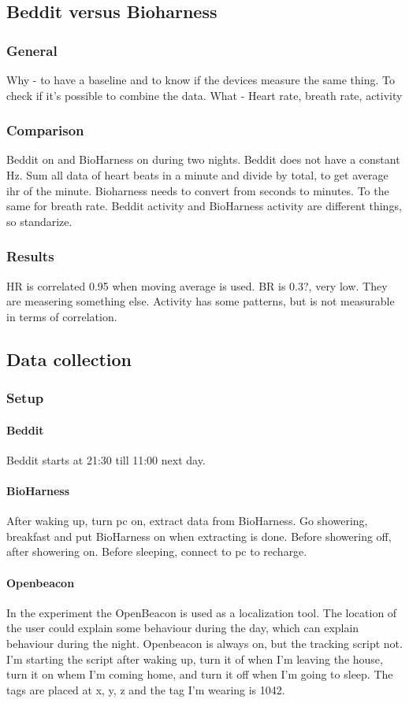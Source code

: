 	\subsection{Beddit versus Bioharness}
		\subsubsection{General}
			Why - to have a baseline and to know if the devices measure the same thing. To check if it's possible to combine the data.
			What - Heart rate, breath rate, activity
		\subsubsection{Comparison}
			Beddit on and BioHarness on during two nights.
			Beddit does not have a constant Hz. Sum all data of heart beats in a minute and divide by total, to get average ihr of the minute. 
			Bioharness needs to convert from seconds to minutes. To the same for breath rate. 
			Beddit activity and BioHarness activity are different things, so standarize.

		\subsubsection{Results}
			HR is correlated 0.95 when moving average is used.
			BR is 0.3?, very low. They are measering something else.
			Activity has some patterns, but is not measurable in terms of correlation.
	\subsection{Data collection}
		\subsubsection{Setup}
			\paragraph{Beddit}
				Beddit starts at 21:30 till 11:00 next day. 
			\paragraph{BioHarness}
				After waking up, turn pc on, extract data from BioHarness. Go showering, breakfast and put BioHarness on when extracting is done. Before showering off, after showering on. Before sleeping, connect to pc to recharge. 
			\paragraph{Openbeacon}
		 		In the experiment the OpenBeacon is used as a localization tool. The location of the user could explain some behaviour during the day, which can explain behaviour during the night. 
				Openbeacon is always on, but the tracking script not. I'm starting the script after waking up, turn it of when I'm leaving the house, turn it on whem I'm coming home, and turn it off when I'm going to sleep. The tags are placed at x, y, z and the tag I'm wearing is 1042. 
